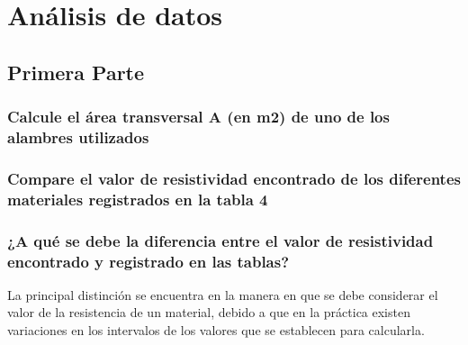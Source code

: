 \documentclass[10pt]{article}
\begin{document}
\begin{multicols}{2}
\begin{figure}[H]
	\end{figure}




	\section{Análisis de datos}

	\subsection{Primera Parte}

	\subsubsection*{Calcule el área transversal A (en m2)
		de uno de los alambres utilizados}


	\subsubsection*{Compare el valor de resistividad encontrado de los diferentes materiales
		registrados en la tabla 4}

	\subsubsection*{¿A qué se debe la diferencia entre el valor de resistividad encontrado y registrado
		en las tablas?}

	La principal distinción se encuentra en la manera en que se debe considerar
	el valor de la resistencia de un material, debido a que en la práctica
	existen variaciones en los intervalos de los valores que se establecen
	para calcularla.


\end{multicols}
\end{document}
